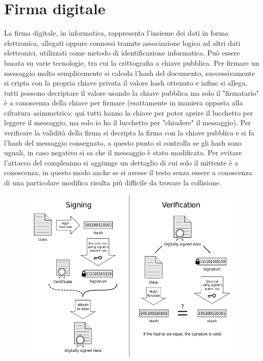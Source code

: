 \documentclass[10pt,a4paper]{article}
\begin{document}
\section{Firma digitale}
La firma digitale, in informatica, rappresenta l'insieme dei dati in forma elettronica, allegati oppure connessi tramite associazione logica ad altri dati elettronici, utilizzati come metodo di identificazione informatica. Può essere basata su varie tecnologie, tra cui la crittografia a chiave pubblica. Per firmare un messaggio molto semplicemente si calcola l'hash del documento, successivamente si cripta con la propria chiave privata il valore hash ottenuto e infine si allega, tutti possono decriptare il valore usando la chiave pubblica ma solo il "firmatario" è a conoscenza della chiave per firmare (esattamente in maniera opposta alla cifratura asimmetrica: qui tutti hanno la chiave per poter aprire il lucchetto per leggere il messaggio, ma solo io ho il lucchetto per "chiudere" il messaggio). Per verificare la validità della firma si decripta la firma con la chiave pubblica e si fa l'hash del messaggio consegnato, a questo punto si controlla se gli hash sono uguali, in caso negativo si sa che il messaggio è stato modificato. Per evitare l'attacco del compleanno si aggiunge un dettaglio di cui solo il mittente è a conoscenza, in questo modo anche se si avesse il testo senza essere a conoscenza di una particolare modifica risulta più difficile da trovare la collisione. 

\begin{figure}[htbp]
\includegraphics[scale=0.4]{immagini/digital-signature.png}
\end{figure}
\end{document}
